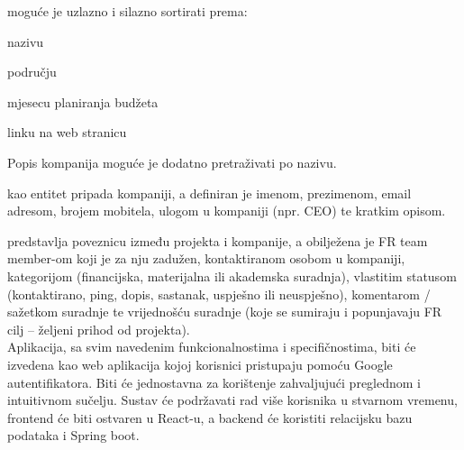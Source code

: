 		\vspace{0.3cm}
		
		{ moguće je uzlazno i silazno sortirati prema:}
		\begin{packed_item}
			\item {nazivu}
			\item {području}
			\item {mjesecu planiranja budžeta}
			\item {linku na web stranicu}
		\end{packed_item}

		{Popis kompanija moguće je dodatno pretraživati po nazivu.}

		{ kao entitet pripada kompaniji, a definiran je imenom, prezimenom, email adresom, brojem mobitela, ulogom u kompaniji (npr. CEO) te kratkim opisom.}\vspace{0.3cm}

		{ predstavlja poveznicu između projekta i kompanije, a obilježena je FR team member-om koji je za nju zadužen, kontaktiranom osobom u kompaniji, kategorijom (financijska, materijalna ili akademska suradnja), vlastitim statusom (kontaktirano, ping, dopis, sastanak, uspješno ili neuspješno), komentarom / sažetkom suradnje te vrijednošću suradnje (koje se sumiraju i popunjavaju FR cilj – željeni prihod od projekta).}\\

		{Aplikacija, sa svim navedenim funkcionalnostima i specifičnostima, biti će izvedena kao web aplikacija kojoj korisnici pristupaju pomoću Google autentifikatora. Biti će jednostavna za korištenje zahvaljujući preglednom i intuitivnom sučelju.
Sustav će podržavati rad više korisnika u stvarnom vremenu, frontend će biti ostvaren u React-u, a backend će koristiti relacijsku bazu podataka i Spring boot.}

	
		\eject
		
	